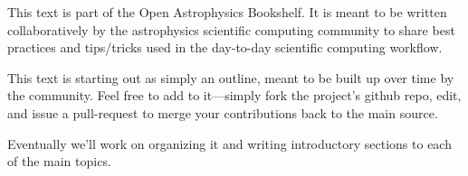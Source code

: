 This text is part of the Open Astrophysics Bookshelf.  It is meant to
be written collaboratively by the astrophysics scientific computing
community to share best practices and tips/tricks used in the day-to-day
scientific computing workflow.

This text is starting out as simply an outline, meant to be built up
over time by the community.  Feel free to add to it---simply fork the
project's github repo, edit, and issue a pull-request to merge your
contributions back to the main source.

Eventually we'll work on organizing it and writing introductory sections
to each of the main topics.  

